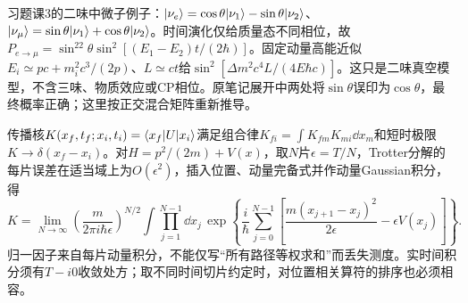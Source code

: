 习题课3的二味中微子例子：$\lvert \nu_e\rangle=\cos\theta\lvert \nu_1\rangle-\sin\theta\lvert \nu_2\rangle$、$\lvert \nu_\mu\rangle=\sin\theta\lvert \nu_1\rangle+\cos\theta\lvert \nu_2\rangle$。时间演化仅给质量态不同相位，故$P_{e\to\mu}=\sin^22\theta\sin^2[(E_1-E_2)t/(2\hbar)]$。固定动量高能近似$E_i\simeq pc+m_i^2c^3/(2p)$、$L\simeq ct$给$\sin^2[\Delta m^2c^4L/(4E\hbar c)]$。这只是二味真空模型，不含三味、物质效应或CP相位。原笔记展开中两处将$\sin\theta$误印为$\cos\theta$，最终概率正确；这里按正交混合矩阵重新推导。

传播核$K(x_f,t_f;x_i,t_i)=\langle x_f\rvert U\lvert x_i\rangle$满足组合律$K_{fi}=\int K_{fm}K_{mi}\dd x_m$和短时极限$K\to\delta(x_f-x_i)$。对$H=p^2/(2m)+V(x)$，取$N$片$\epsilon=T/N$，Trotter分解的每片误差在适当域上为$O(\epsilon^2)$，插入位置、动量完备式并作动量Gaussian积分，得
\[
 K=\lim_{N\to\infty}\left(\frac m{2\pi i\hbar\epsilon}\right)^{N/2}
 \int\prod_{j=1}^{N-1}\dd x_j\,
 \exp\left\{\frac i\hbar\sum_{j=0}^{N-1}
 \left[\frac{m(x_{j+1}-x_j)^2}{2\epsilon}-\epsilon V(x_j)\right]\right\}.
\]
归一因子来自每片动量积分，不能仅写“所有路径等权求和”而丢失测度。实时间积分须有$T-i0$收敛处方；取不同时间切片约定时，对位置相关算符的排序也必须相容。

